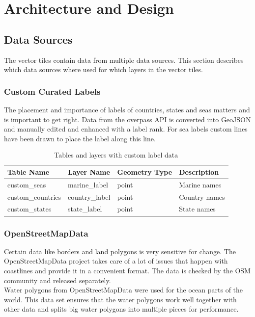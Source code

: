 \chapter{Architecture and Design}\label{design}


\section{Data Sources}\label{data_sources}

The vector tiles contain data from multiple data sources. This section describes which data sources where used for which layers in the vector tiles.

\subsection{Custom Curated Labels}

The placement and importance of labels of countries, states and seas matters\cite{12_axismaps.github.io_2015} and is important to get right. Data from the overpass API \cite{13_wiki.openstreetmap.org_2015} is converted into GeoJSON and
manually edited and enhanced with a label rank. For sea labels custom lines have been drawn to place the label along this line.

\begin{table}[H]
\centering
    \begin{tabular}{llll}
    \hline
    Table Name   & Layer Name & Geometry Type & Description \\
    \hline                                          
    custom\_seas       & marine\_label & point    & Marine names \\
    custom\_countries    & country\_label & point    & Country names \\
    custom\_states       & state\_label & point    & State names \\
    \end{tabular}
    \caption{Tables and layers with custom label data}
\end{table}

\subsection{OpenStreetMapData}

Certain \osm{} data like borders and land polygons is very sensitive for change.
The OpenStreetMapData\cite{14_openstreetmapdata.com_2015}
project takes care of a lot of issues that happen with coastlines
and provide it in a convenient format. The data is checked by the OSM community
and released separately.
\\
Water polygons\cite{15_openstreetmapdata.com_2015} from OpenStreetMapData were used for the ocean parts of the world. This data set ensures that the water polygons
work well together with other \osm{} data and splits big water polygons into multiple 
pieces for performance.

